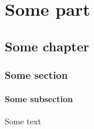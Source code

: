 \documentclass{memoir-tagging}
\begin{document}
\tableofcontents

\part{Some part}
\chapter{Some chapter}
\section{Some section}
\subsection{Some subsection}

Some text
\end{document}

